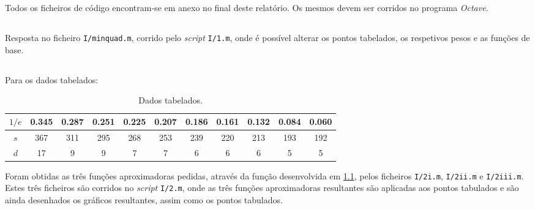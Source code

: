 \documentclass[portuguese, a4paper]{article}
\newcommand\tu[0]{\textunderscore}
\begin{document}


\renewcommand{\thesection}{\Roman{section}}
\renewcommand{\thesubsection}{\arabic{subsection}.}
\renewcommand{\thesubsubsection}{\alph{subsubsection})}

\renewcommand{\contentsname}{Índice}
\tableofcontents
\newpage

\section{} \label{sec:I}
	\par
	Todos os ficheiros de código encontram-se em anexo no final deste relatório. Os mesmos devem ser corridos no programa \emph{Octave}.

	\subsection{} \label{sec:I.1}
	\par
	Resposta no ficheiro \texttt{I/min\tu quad.m}, corrido pelo \emph{script} \texttt{I/1.m}, onde é possível alterar os pontos tabelados, os respetivos pesos e as funções de base.

	\subsection{} \label{sec:I.2}
	\par
	Para os dados tabelados:
	\begin{table}[H]
		\centering
		\begin{tabular}{c|c|c|c|c|c|c|c|c|c|c}
			\hline
			$1/e$	& 0.345	& 0.287	& 0.251	& 0.225	& 0.207	& 0.186	& 0.161	& 0.132	& 0.084	& 0.060	\\ \hline
			$s$		& 367	& 311	& 295	& 268	& 253	& 239	& 220	& 213	& 193	& 192	\\ \hline
			$d$		& 17	& 9		& 9		& 7		& 7		& 6		& 6		& 6		& 5		& 5		\\ \hline
		\end{tabular}
		\caption{Dados tabelados.}
	\end{table}

	\par
	Foram obtidas as três funções aproximadoras pedidas, através da função desenvolvida em \ref{sec:I.1}, pelos ficheiros \texttt{I/2\tu i.m}, \texttt{I/2\tu ii.m} e \texttt{I/2\tu iii.m}. Estes três ficheiros são corridos no \emph{script} \texttt{I/2.m}, onde as três funções aproximadoras resultantes são aplicadas aos pontos tabulados e são ainda desenhados os gráficos resultantes, assim como os pontos tabulados.
\end{document}
